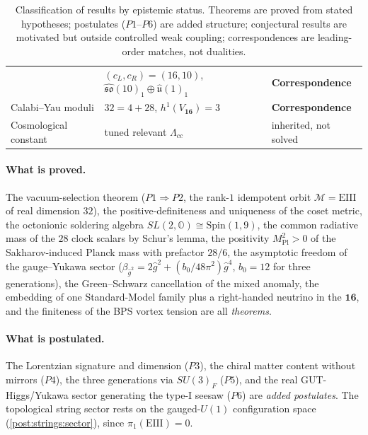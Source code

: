 \documentclass[11pt]{article}
\theoremstyle{plain}
\theoremstyle{definition}
\theoremstyle{remark}
\begin{document}
\begin{table}[h]
\begin{tabular}{lll}
  & $(c_{L},c_{R})=(16,10)$, $\widehat{\mathfrak{so}}(10)_{1}\oplus\widehat{\mathfrak u}(1)_{1}$
  & \textbf{Correspondence}\\
Calabi--Yau moduli
  & $32=4+28$, $h^{1}(V_{\mathbf{16}})=3$
  & \textbf{Correspondence}\\
Cosmological constant
  & tuned relevant $\Lambda_{cc}$
  & inherited, not solved\\
\hline
\end{tabular}
\caption{Classification of results by epistemic status. Theorems are
proved from stated hypotheses; postulates ($P1$--$P6$) are added
structure; conjectural results are motivated but outside controlled
weak coupling; correspondences are leading-order matches, not
dualities.}
\label{tab:strings:ledger}
\end{table}

\paragraph{What is proved.}
The vacuum-selection theorem ($P1\Rightarrow P2$, the rank-$1$
idempotent orbit $\mathcal{M}=\mathrm{EIII}$ of real dimension $32$), the
positive-definiteness and uniqueness of the coset metric, the octonionic
soldering algebra $SL(2,\mathbb{O})\cong\mathrm{Spin}(1,9)$, the common
radiative mass of the $28$ clock scalars by Schur's lemma, the positivity
$M_{\mathrm{Pl}}^{2}>0$ of the Sakharov-induced Planck mass with
prefactor $28/6$, the asymptotic freedom of the gauge--Yukawa sector
($\beta_{\hat g^{2}}=2\hat g^{2}+(b_{0}/48\pi^{2})\hat g^{4}$,
$b_{0}=12$ for three generations), the Green--Schwarz cancellation of the
mixed anomaly, the embedding of one Standard-Model family plus a
right-handed neutrino in the $\mathbf{16}$, and the finiteness of the BPS
vortex tension are all \emph{theorems}.

\paragraph{What is postulated.}
The Lorentzian signature and dimension ($P3$), the chiral matter content
without mirrors ($P4$), the three generations via $SU(3)_{F}$ ($P5$), and
the real GUT-Higgs/Yukawa sector generating the type-I seesaw ($P6$) are
\emph{added postulates}. The topological string sector rests on the
gauged-$U(1)$ configuration space (\autoref{post:strings:sector}), since
$\pi_{1}(\mathrm{EIII})=0$.
\end{document}
